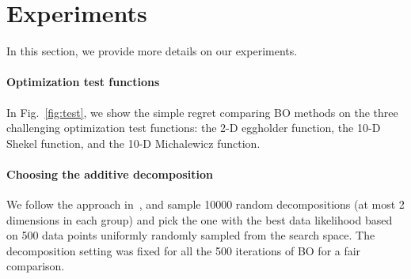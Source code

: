 \section{Experiments}


In this section, we provide more details on our experiments.

\paragraph{Optimization test functions}
In Fig.~\ref{fig:test}, we show the simple regret comparing BO methods on the three challenging optimization test functions: the 2-D eggholder function, the 10-D Shekel function, and the 10-D Michalewicz function.

\paragraph{Choosing the additive decomposition} 
We follow the approach in~\cite{kandasamy2015high}, and sample
10000 random decompositions (at most 2 dimensions in each
group) and pick the one with the best data likelihood based on 500
data points uniformly randomly sampled from the search space.
The decomposition setting was fixed for all the 500 iterations of
BO for a fair comparison.